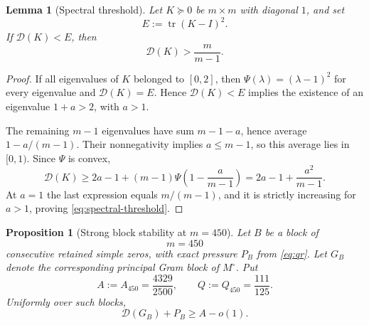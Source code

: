 \documentclass[11pt]{article}
\newtheorem{proposition}[theorem]{Proposition}
\newtheorem{lemma}[theorem]{Lemma}
\begin{document}
\begin{lemma}[Spectral threshold]\label{lem:spectral-threshold}
Let \(K\succeq0\) be \(m\times m\) with diagonal \(1\), and set
\[
 E:=\operatorname{tr}(K-I)^2.
\]
If \(\mathcal D(K)<E\), then
\begin{equation}\label{eq:spectral-threshold}
 \mathcal D(K)>\frac{m}{m-1}.
\end{equation}
\end{lemma}

\begin{proof}
If all eigenvalues of \(K\) belonged to \([0,2]\), then
\(\Psi(\lambda)=(\lambda-1)^2\) for every eigenvalue and
\(\mathcal D(K)=E\).  Hence \(\mathcal D(K)<E\) implies the existence of
an eigenvalue \(1+a>2\), with \(a>1\).

The remaining \(m-1\) eigenvalues have sum \(m-1-a\), hence average
\(1-a/(m-1)\).  Their nonnegativity implies \(a\le m-1\), so this
average lies in \([0,1)\).  Since \(\Psi\) is convex,
\[
 \mathcal D(K)
 \ge
 2a-1
 +(m-1)\Psi\!\left(1-\frac{a}{m-1}\right)
 =
 2a-1+\frac{a^2}{m-1}.
\]
At \(a=1\) the last expression equals \(m/(m-1)\), and it is strictly
increasing for \(a>1\), proving \eqref{eq:spectral-threshold}.
\end{proof}


\begin{proposition}[Strong block stability at \(m=450\)]
\label{prop:blockstab450}
Let \(B\) be a block of
\[
 m=450
\]
consecutive retained simple zeros, with exact pressure \(P_B\) from
\eqref{eq:qr}.  Let \(G_B\) denote the corresponding principal Gram
block of \(M^\circ\).  Put
\begin{equation}\label{eq:AQ450}
 A:=A_{450}=\frac{4329}{2500},
 \qquad
 Q:=Q_{450}=\frac{111}{125}.
\end{equation}
Uniformly over such blocks,
\begin{equation}\label{eq:blockstab450}
 \boxed{\mathcal D(G_B)+P_B\ge A-o(1)}.
\end{equation}
\end{proposition}
\end{document}
